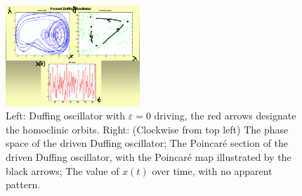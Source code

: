 \begin{ex}
\begin{figure}[h!]
	\includegraphics[width=0.45\textwidth]{figures/ch6/2pert_duffing.png}
	\caption{Left: Duffing oscillator with $\varepsilon=0$ driving, the red arrows designate the homoclinic orbits. Right: (Clockwise from top left) The phase space of the driven Duffing oscillator; The Poincaré section of the driven Duffing oscillator, with the Poincaré map illustrated by the black arrows; The value of $x(t)$ over time, with no apparent pattern.}
	\label{fig:pert_duffing}
\end{figure}

\end{ex}


